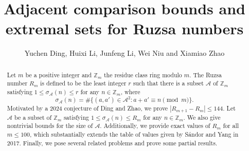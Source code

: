 \documentclass[12pt,a4paper,reqno]{amsart}
\numberwithin{equation}{section}
\theoremstyle{plain}
\theoremstyle{definition}
\begin{document}
\title
[Adjacent comparison bounds and extremal sets for Ruzsa numbers]
{Adjacent comparison bounds and extremal sets for Ruzsa numbers}

\author
[Y. Ding, H. Li, J. Li, N. Wei and X. Zhao] {Yuchen Ding, Huixi Li, Junfeng Li, Wei Niu and Xiamiao Zhao}

\address{(Yuchen Ding$^{1,2}$) $^1$School of Mathematics,  Yangzhou University, Yangzhou 225002, People's Republic of China}
\address{$^2$HUN-REN Alfr\'ed R\'enyi Institute of Mathematics, Budapest, Pf. 127, H-1364 Hungary}

\address{(Huixi Li) School of Mathematical Sciences and LPMC, Nankai University, Tianjin
300071, People's Republic of China}

\address{(Junfeng Li) School of Mathematical Sciences and LPMC, Nankai University, Tianjin
300071, People's Republic of China}

\address{(Wei Niu$^{1,2}$) $^1$School of Mathematics and Statistics, Xi'an Jiaotong University, 28 Xianning
West Road, Beilin District, Xi'an, Shaanxi, China}
\address{$^2$Department of Computer Science and Information Theory,
Budapest University of Technology and Economics,
M\H{u}egyetem rakpart 3,
H-1111 Budapest,
Hungary}

\address{(Xiamiao Zhao) Department of Mathematical Sciences, Tsinghua University, Beijing, People's Republic of China}



\begin{abstract}
Let $m$ be a positive integer and $\mathbb{Z}_m$ the residue class ring modulo $m$. The Ruzsa number $R_m$ is defined to be the least integer $r$ such that there is a subset $\mathcal{A}$ of $\mathbb{Z}_m$ satisfying 
$
1\le \sigma_{\mathcal{A}}(n)\le r
$
for any $n\in \mathbb{Z}_m$, where 
$$
\sigma_{\mathcal{A}}(n)
=\#\big\{(a,a')\in\mathcal A^2:
 a+a'\equiv n\pmod{m}\big\}.
$$
Motivated by a 2024 conjecture of Ding and Zhao, we prove 
$
| R_{m+1}-R_m|\le 144.
$
Let $\mathcal{A}$ be a subset of $\mathbb{Z}_m$ satisfying 
$
1\le \sigma_{\mathcal{A}}(n)\le R_m
$
for any $n\in \mathbb{Z}_m$. We also give nontrivial bounds for the size of $\mathcal{A}$. 
Additionally, we provide exact values of $R_m$ for all $m\le 100$, which substantially extends the table of values given by S\'andor and Yang in 2017. Finally, we pose several related problems and prove some partial results.
\end{abstract}
\maketitle
\end{document}

